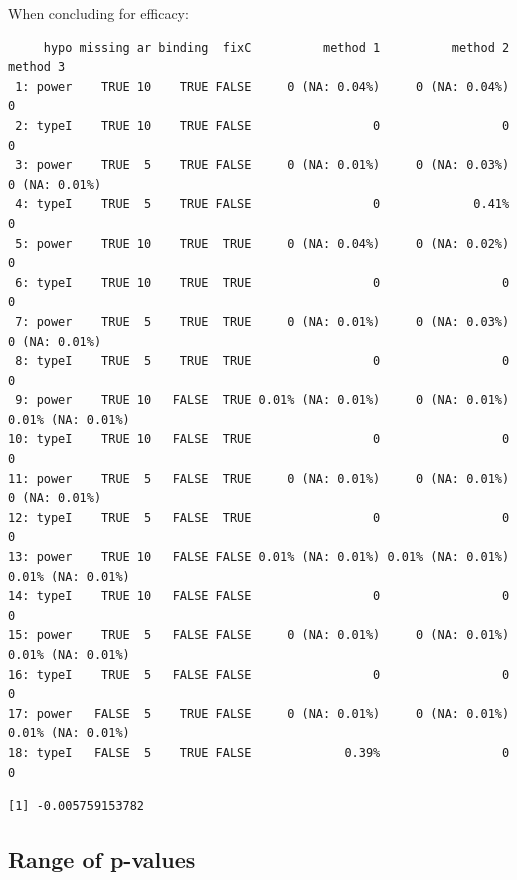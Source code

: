 \documentclass[12pt]{article}
\begin{document}
When concluding for efficacy:
\begin{verbatim}
     hypo missing ar binding  fixC          method 1          method 2          method 3
 1: power    TRUE 10    TRUE FALSE     0 (NA: 0.04%)     0 (NA: 0.04%)                 0
 2: typeI    TRUE 10    TRUE FALSE                 0                 0                 0
 3: power    TRUE  5    TRUE FALSE     0 (NA: 0.01%)     0 (NA: 0.03%)     0 (NA: 0.01%)
 4: typeI    TRUE  5    TRUE FALSE                 0             0.41%                 0
 5: power    TRUE 10    TRUE  TRUE     0 (NA: 0.04%)     0 (NA: 0.02%)                 0
 6: typeI    TRUE 10    TRUE  TRUE                 0                 0                 0
 7: power    TRUE  5    TRUE  TRUE     0 (NA: 0.01%)     0 (NA: 0.03%)     0 (NA: 0.01%)
 8: typeI    TRUE  5    TRUE  TRUE                 0                 0                 0
 9: power    TRUE 10   FALSE  TRUE 0.01% (NA: 0.01%)     0 (NA: 0.01%) 0.01% (NA: 0.01%)
10: typeI    TRUE 10   FALSE  TRUE                 0                 0                 0
11: power    TRUE  5   FALSE  TRUE     0 (NA: 0.01%)     0 (NA: 0.01%)     0 (NA: 0.01%)
12: typeI    TRUE  5   FALSE  TRUE                 0                 0                 0
13: power    TRUE 10   FALSE FALSE 0.01% (NA: 0.01%) 0.01% (NA: 0.01%) 0.01% (NA: 0.01%)
14: typeI    TRUE 10   FALSE FALSE                 0                 0                 0
15: power    TRUE  5   FALSE FALSE     0 (NA: 0.01%)     0 (NA: 0.01%) 0.01% (NA: 0.01%)
16: typeI    TRUE  5   FALSE FALSE                 0                 0                 0
17: power   FALSE  5    TRUE FALSE     0 (NA: 0.01%)     0 (NA: 0.01%) 0.01% (NA: 0.01%)
18: typeI   FALSE  5    TRUE FALSE             0.39%                 0                 0
\end{verbatim}

\begin{verbatim}
[1] -0.005759153782
\end{verbatim}

\subsection{Range of p-values}
\label{sec:org59d0ca4}
\end{document}
